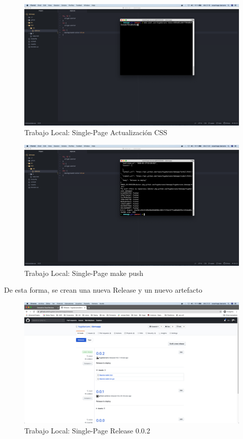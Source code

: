 \documentclass[a4paper,11pt]{book}
\begin{document}
   \begin{figure}[H]
\centering
\includegraphics[scale=0.2]{imagenes/casouso/3_5.png}
\caption{   Trabajo Local: Single-Page Actualización CSS}
\end{figure}

   \begin{figure}[H]
\centering
\includegraphics[scale=0.2]{imagenes/casouso/3_6.png}
\caption{ Trabajo Local: Single-Page make push  }
\end{figure}

De esta forma, se crean una nueva Release y un nuevo artefacto 

   \begin{figure}[H]
\centering
\includegraphics[scale=0.2]{imagenes/casouso/3_7.png}
\caption{  Trabajo Local: Single-Page Release 0.0.2 }
\end{figure}
\end{document}
